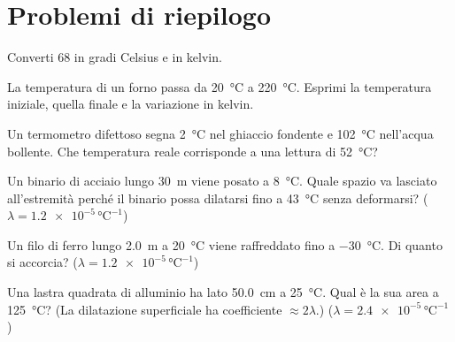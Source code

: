 \section{Problemi di riepilogo}

\begin{esercizio}
Converti \SI{68}{\fahrenheit} in gradi Celsius e in kelvin.\\
\end{esercizio}

\begin{esercizio}
La temperatura di un forno passa da \SI{20}{\celsius} a \SI{220}{\celsius}. Esprimi la temperatura iniziale, quella finale e la variazione in kelvin.\\
\end{esercizio}

\begin{esercizio}
Un termometro difettoso segna \SI{2}{\celsius} nel ghiaccio fondente e \SI{102}{\celsius} nell'acqua bollente. Che temperatura reale corrisponde a una lettura di \SI{52}{\celsius}?\\
\end{esercizio}

\begin{esercizio}
Un binario di acciaio lungo \SI{30}{\metre} viene posato a \SI{8}{\celsius}. Quale spazio va lasciato all'estremità perché il binario possa dilatarsi fino a \SI{43}{\celsius} senza deformarsi? ($\lambda = \num{1,2e-5}\,\si{\celsius}^{-1}$)\\
\end{esercizio}

\begin{esercizio}
Un filo di ferro lungo \SI{2,0}{\metre} a \SI{20}{\celsius} viene raffreddato fino a \SI{-30}{\celsius}. Di quanto si accorcia? ($\lambda = \num{1,2e-5}\,\si{\celsius}^{-1}$)\\
\end{esercizio}

\begin{esercizio}
Una lastra quadrata di alluminio ha lato \SI{50,0}{\centi\metre} a \SI{25}{\celsius}. Qual è la sua area a \SI{125}{\celsius}? (La dilatazione superficiale ha coefficiente $\approx 2\lambda$.) ($\lambda = \num{2,4e-5}\,\si{\celsius}^{-1}$)\\
\end{esercizio}

